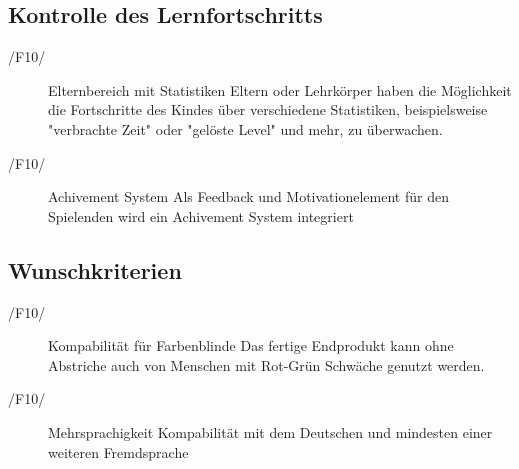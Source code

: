 \subsection{Kontrolle des Lernfortschritts}

\begin{description}
	\item[/F10/] Elternbereich mit Statistiken \label{F10} \newline
	Eltern oder Lehrkörper haben die Möglichkeit die Fortschritte des Kindes über verschiedene Statistiken, beispielsweise "verbrachte Zeit" oder "gelöste Level" und mehr,  zu überwachen.
	\item[/F10/] Achivement System\label{F10} \newline
	Als Feedback und Motivationelement für den Spielenden wird ein Achivement System integriert 
\end{description}

\subsection{Wunschkriterien}

\begin{description}
	\item[/F10/]Kompabilität für Farbenblinde\label{F10} \newline
	Das fertige Endprodukt kann ohne Abstriche auch von Menschen mit Rot-Grün Schwäche genutzt werden.
	\item[/F10/] Mehrsprachigkeit\label{F10} \newline
	Kompabilität mit dem Deutschen und mindesten einer weiteren Fremdsprache
\end{description}
